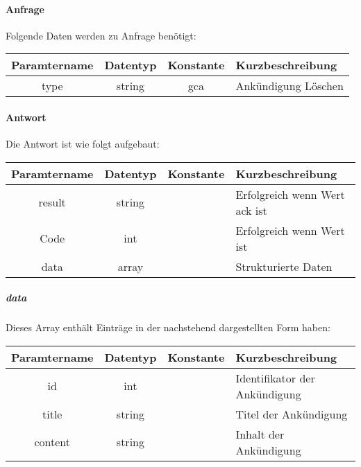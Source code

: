 \paragraph{Anfrage}Folgende Daten werden zu Anfrage benötigt:
\begin{table}[H]
	\begin{tabular}{|c|c|c|p{6.5cm}|}
		\hline
		\textbf{Paramtername} & \textbf{Datentyp} & \textbf{Konstante} & \textbf{Kurzbeschreibung}                                                                                               \\ \hline
		type                & string            & gca                & Ankündigung Löschen \\ \hline
	\end{tabular}
\end{table}
\paragraph{Antwort}Die Antwort ist wie folgt aufgebaut:
\begin{table}[H]
	\begin{tabular}{|c|c|c|p{6.5cm}|}
		\hline
		\textbf{Paramtername} & \textbf{Datentyp} & \textbf{Konstante} & \textbf{Kurzbeschreibung}                                                                                               \\ \hline
		result              & string           &                 & Erfolgreich wenn Wert {\glqq ack\grqq} ist \\ \hline
		Code                & int              &                 & Erfolgreich wenn Wert {\glqq 0\grqq} ist \\ \hline
		data                & array            &                 & Strukturierte Daten \\ \hline
	\end{tabular}
\end{table}
\subparagraph{data}Dieses Array enthält Einträge in der nachstehend dargestellten Form haben:
\begin{table}[H]
	\begin{tabular}{|c|c|c|p{6.5cm}|}
		\hline
		\textbf{Paramtername} & \textbf{Datentyp} & \textbf{Konstante} & \textbf{Kurzbeschreibung}    \\ \hline
		id      & int               &                 & Identifikator der Ankündigung\\ \hline
		title   & string            &                 & Titel der Ankündigung \\ \hline
		content & string            &                 & Inhalt der Ankündigung \\ \hline
	\end{tabular}
\end{table}
